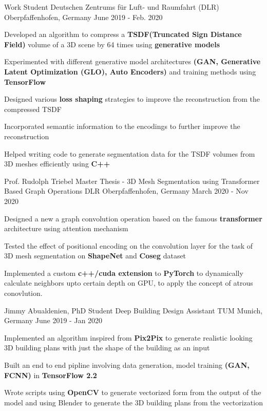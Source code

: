 \begin{cventries}
  \cventry
  {Work Student} %
  {Deutschen Zentrums für Luft- und Raumfahrt (DLR)} %
  {Oberpfaffenhofen, Germany} %
  {June 2019 - Feb. 2020} %
  {
  \begin{cvitems} %
    \item {Developed an algorithm to compress a \textbf{TSDF(Truncated Sign
    Distance Field)} volume of a 3D scene by 64 times using
    \textbf{generative models}}
    \item {Experimented with different generative model architectures
    \textbf{(GAN, Generative Latent Optimization (GLO), Auto Encoders)} and
    training methods using \textbf{TensorFlow}}
    \item {Designed various \textbf{loss shaping} strategies to improve the
    reconstruction from the compressed TSDF}
    \item {Incorporated semantic information to the encodings to further improve the reconstruction}
    \item {Helped writing code to generate segmentation data for the TSDF
    volumes from 3D meshes efficiently using \textbf{C++}}
  \end{cvitems}
  }
  \cventry
  {Prof. Rudolph Triebel} %
  {Master Thesis - 3D Mesh Segmentation using Transformer Based Graph Operations} %
  {DLR Oberpfaffenhofen, Germany} %
  {March 2020 - Nov 2020} %
  {
  \begin{cvitems} %
    \item {Designed a new a graph convolution operation based on the famous \textbf{transformer} architecture using attention mechanism}
    \item {Tested the effect of positional encoding on the convolution layer for
    the task of 3D mesh segmentation on \textbf{ShapeNet} and \textbf{Coseg} dataset}
    \item {Implemented a custom \textbf{c++/cuda extension} to \textbf{PyTorch} to dynamically calculate neighbors upto certain depth on GPU, to apply the concept of atrous conovlution.}
  \end{cvitems}
  }
	\cventry
	{Jimmy Abualdenien, PhD Student} %
	{Deep Building Design Assistant} %
	{TUM Munich, Germany} %
	{June 2019 - Jan 2020} %
	{
		\begin{cvitems} %
			\item {Implemented an algorithm inspired from \textbf{Pix2Pix} to generate realistic looking 3D building plans with just the shape of the building as an input}
			\item {Built an end to end pipline involving data generation, model training \textbf{(GAN, FCNN)} in \textbf{TensorFlow 2.2}}
			\item {Wrote scripts using \textbf{OpenCV} to generate vectorized form from the output of the model and using Blender to generate the 3D building plans from the vectorization}
		\end{cvitems}
	}
\end{cventries}
